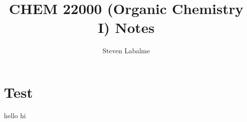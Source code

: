 \documentclass{report}
\title{CHEM 22000 (Organic Chemistry I) Notes}
\author{Steven Labalme}
\begin{document}
\maketitle



\tableofcontents
\newpage



\pagestyle{main}
\renewcommand{\chaptermark}[1]{\markboth{\chaptername\ \thechapter\ (#1)}{}}
\chapter{Test}
hello
\newpage
hi
\end{document}
